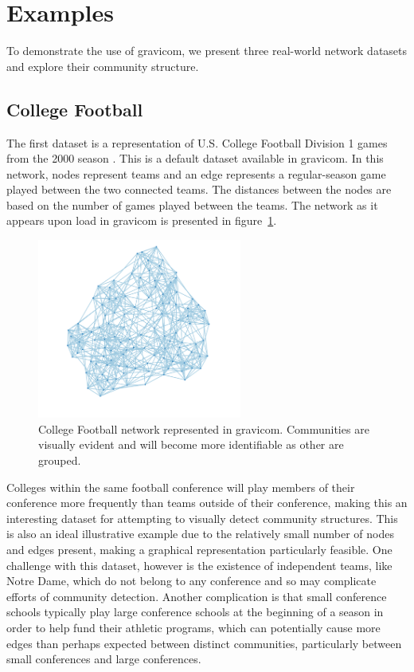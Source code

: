 \documentclass{article}\usepackage[]{graphicx}\usepackage[]{color}
\begin{document}
\section{Examples}

To demonstrate the use of gravicom, we present three real-world network datasets and explore their community structure.

\subsection{College Football} \label{sec:football}
The first dataset is a representation of U.S. College Football Division 1 games from the 2000 season \cite{gn-football}. This is a default dataset available in gravicom. In this network, nodes represent teams and an edge represents a regular-season game played between the two connected teams. The distances between the nodes are based on the number of games played between the teams. The network as it appears upon load in gravicom is presented in figure~\ref{fig:football_1}. 

\begin{figure}[H]
\centering
\includegraphics[width=0.6\textwidth]{images/football_1.png}
\caption{\label{fig:football_1} College Football network represented in gravicom. Communities are visually evident and will become more identifiable as other are grouped.}
\end{figure}

Colleges within the same football conference will play members of their conference more frequently than teams outside of their conference, making this an interesting dataset for attempting to visually detect community structures. This is also an ideal illustrative example due to the relatively small number of nodes and edges present, making a graphical representation particularly feasible. One challenge with this dataset, however is the existence of independent teams, like Notre Dame, which do not belong to any conference and so may complicate efforts of community detection. Another complication is that small conference schools typically play large conference schools at the beginning of a season in order to help fund their athletic programs, which can potentially cause more edges than perhaps expected between distinct communities, particularly between small conferences and large conferences.
\end{document}
